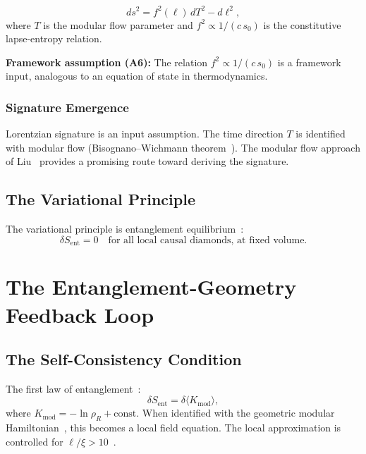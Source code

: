 \documentclass[aps,prd,twocolumn,superscriptaddress,nofootinbib,floatfix]{revtex4-2}
\newcommand{\sn}{s_0}
\newcommand{\Kmod}{K_{\mathrm{mod}}}
\newcommand{\Sent}{S_{\mathrm{ent}}}
\begin{document}
\begin{equation}
\label{eq:metric}
ds^2 = f^2(\ell)\,dT^2 - d\ell^2,
\end{equation}
where $T$ is the modular flow parameter and $f^2 \propto 1/(c\,\sn)$ is the constitutive lapse-entropy relation.

\textbf{Framework assumption (A6):} The relation $f^2 \propto 1/(c\,\sn)$ is a framework input, analogous to an equation of state in thermodynamics.

\subsubsection{Signature Emergence}

Lorentzian signature is an input assumption. The time direction $T$ is identified with modular flow (Bisognano--Wichmann theorem~\cite{BisognanoWichmann1976}). The modular flow approach of Liu~\cite{Liu2025} provides a promising route toward deriving the signature.

\subsection{The Variational Principle}
\label{sec:variational}

The variational principle is entanglement equilibrium~\cite{Jacobson2016}:
\begin{equation}
\delta\Sent = 0 \quad \text{for all local causal diamonds, at fixed volume.}
\end{equation}

\section{The Entanglement-Geometry Feedback Loop}
\label{sec:feedback}

\subsection{The Self-Consistency Condition}

The first law of entanglement~\cite{Lashkari2014,BlancoCasiniHungMyers2013,JLMS2016}:
\begin{equation}
\delta\Sent = \delta\langle\Kmod\rangle,
\end{equation}
where $\Kmod = -\ln\rho_R + \text{const}$. When identified with the geometric modular Hamiltonian~\cite{BisognanoWichmann1976,CasiniHuertaMyers2011}, this becomes a local field equation. The local approximation is controlled for $\ell/\xi > 10$~\cite{Dalmonte2018}.
\end{document}
